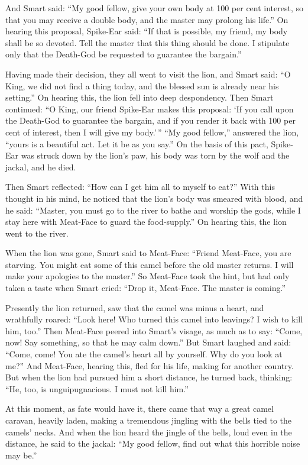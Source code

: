 \documentclass[article, twoside, 14pt]{memoir}
\begin{document}
And Smart said:
``My good fellow, give your own body at 100 per cent interest, so that you may receive a double body, and the master may prolong his life.''
On hearing this proposal, Spike-Ear said:
``If that is possible, my friend, my body shall be so devoted. Tell the master that this thing should be done. I stipulate only that the Death-God be requested to guarantee the bargain.''

Having made their decision, they all went to visit the lion, and
Smart said:
``O King, we did not find a thing today, and the blessed sun is already near his setting.''
On hearing this, the lion fell into deep despondency. Then Smart
continued:
``O King, our friend Spike-Ear makes this proposal: `If you call upon the Death-God to guarantee the bargain, and if you render it back with 100 per cent of interest, then I will give my body.'\,''
``My good fellow,'' answered the lion,
``yours is a beautiful act. Let it be as you say.'' On the basis of
this pact, Spike-Ear was struck down by the lion's paw, his body
was torn by the wolf and the jackal, and he died.

Then Smart reflected: ``How can I get him all to myself to eat?''
With this thought in his mind, he noticed that the lion's body was
smeared with blood, and he said:
``Master, you must go to the river to bathe and worship the gods, while I stay here with Meat-Face to guard the food-supply.''
On hearing this, the lion went to the river.

When the lion was gone, Smart said to Meat-Face:
``Friend Meat-Face, you are starving. You might eat some of this camel before the old master returns. I will make your apologies to the master.''
So Meat-Face took the hint, but had only taken a taste when Smart
cried: ``Drop it, Meat-Face. The master is coming.''

Presently the lion returned, saw that the camel was minus a heart,
and wrathfully roared:
``Look here! Who turned this camel into leavings? I wish to kill him, too.''
Then Meat-Face peered into Smart's visage, as much as to say:
``Come, now! Say something, so that he may calm down.'' But Smart
laughed and said:
``Come, come! You ate the camel's heart all by yourself. Why do you look at me?''
And Meat-Face, hearing this, fled for his life, making for another
country. But when the lion had pursued him a short distance, he
turned back, thinking:
``He, too, is unguipugnacious. I must not kill him.''

At this moment, as fate would have it, there came that way a great
camel caravan, heavily laden, making a tremendous jingling with the
bells tied to the camels' necks. And when the lion heard the jingle
of the bells, loud even in the distance, he said to the jackal:
``My good fellow, find out what this horrible noise may be.''
\end{document}
